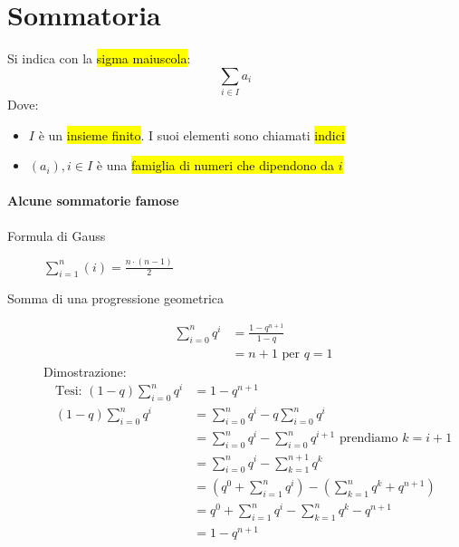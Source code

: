 \section{Sommatoria}
Si indica con la \hl{sigma maiuscola}:
\[
    \sum_{i \in I} a_i
\]
Dove:
\begin{itemize}
    \item $I$ è un \hl{insieme finito}. I suoi elementi sono chiamati \hl{indici}
    \item $(a_i), i \in I$ è una \hl{famiglia di numeri che dipendono da $i$}
\end{itemize}

\paragraph{Alcune sommatorie famose}
\begin{description}
    \item[Formula di Gauss] $\sum_{i=1}^n (i) = \frac{n\cdot(n-1)}{2}$
    \item[Somma di una progressione geometrica]
        \begin{align*}
            \sum_{i = 0}^n q^i &= \frac{1-q^{n+1}}{1-q} \\
            &= n+1 \text{ per } q = 1
        \end{align*}
        Dimostrazione:
        \begin{align*}
            \text{Tesi: } (1-q)\sum_{i = 0}^n q^i &= 1-q^{n+1} \\
            (1-q)\sum_{i = 0}^n q^i &= \sum_{i = 0}^n q^i - q \sum_{i = 0}^n q^i \\
            &= \sum_{i = 0}^n q^i - \sum_{i = 0}^n q^{i+1} \text{ prendiamo } k = i + 1 \\
            &= \sum_{i = 0}^n q^i - \sum_{k = 1}^{n+1} q^{k} \\
            &= (q^0 + \sum_{i = 1}^n q^i) - (\sum_{k = 1}^{n} q^{k} + q^{n+1}) \\
            &= q^0 + \sum_{i = 1}^n q^i - \sum_{k = 1}^{n} q^{k} - q^{n+1} \\
            &= 1 - q^{n+1} \\
        \end{align*}
\end{description}

